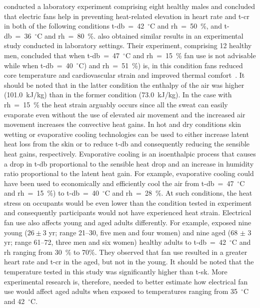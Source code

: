  conducted a laboratory experiment comprising eight healthy males and concluded that electric fans help in preventing heat-related elevation in heart rate and \ac{t-cr} in both of the following conditions \ac{t-db}~=~42~$^{\circ}$C and \ac{rh}~=~50~\%, and \ac{t-db}~=~36~$^{\circ}$C and \ac{rh}~=~80~\%.
 also obtained similar results in an experimental study conducted in laboratory settings.
Their experiment, comprising 12 healthy men, concluded that when \ac{t-db}~=~47~$^{\circ}$C and \ac{rh}~=~15~\% fan use is not advisable while when \ac{t-db}~=~40~$^{\circ}$C) and \ac{rh}~=~51~\%) is, in this condition fans reduced core temperature and cardiovascular strain and improved thermal comfort~\cite{Morris2019}.
It should be noted that in the latter condition the enthalpy of the air was higher (101.0~kJ/kg) than in the former condition (73.0~kJ/kg).
In the case with \ac{rh}~=~15~\% the heat strain arguably occurs since all the sweat can easily evaporate even without the use of elevated air movement and the increased air movement increases the convective heat gains.
In hot and dry conditions skin wetting or evaporative cooling technologies can be used to either increase latent heat loss from the skin or to reduce \ac{t-db} and consequently reducing the sensible heat gains, respectively. 
Evaporative cooling is an isoenthalpic process that causes a drop in \ac{t-db} proportional to the sensible heat drop and an increase in humidity ratio proportional to the latent heat gain.
For example, evaporative cooling could have been used to economically and efficiently cool the air from \ac{t-db}~=~47~$^{\circ}$C and \ac{rh}~=~15~\%) to \ac{t-db}~=~40~$^{\circ}$C and \ac{rh}~=~28~\%\@. 
At such conditions, the heat stress on occupants would be even lower than the condition tested in  experiment and consequently participants would not have experienced heat strain.
Electrical fan use also affects young and aged adults differently.
For example,  exposed nine young ($26 \pm 3$ yr; range 21--30, five men and four women) and nine aged (68 $\pm$ 3 yr; range 61--72, three men and six women) healthy adults to \ac{t-db}~=~42~$^{\circ}$C and \ac{rh} ranging from 30~\% to 70\%.
They observed that fan use resulted in a greater heart rate and \ac{t-cr} in the aged, but not in the young.
It should be noted that the temperature tested in this study was significantly higher than \ac{t-sk}.
More experimental research is, therefore, needed to better estimate how electrical fan use would affect aged adults when exposed to temperatures ranging from 35~$^{\circ}$C and 42~$^{\circ}$C. 

